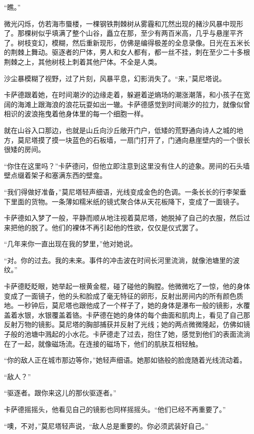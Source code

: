 \documentclass[AutoFakeBold=true]{book}
\begin{document}
``瞧。''

微光闪烁，仿若海市蜃楼，一棵钢铁荆棘树从雾霾和兀然出现的赭沙风暴中现形了。那棵树似乎填满了整个山谷，矗立在那，至少有两百米高，几乎与悬崖平齐了。树枝变幻，模糊，然后重新现形，仿佛是编得极差的全息录像。日光在五米长的荆棘上舞动。驱逐者的尸体，男人和女人都有，都一丝不挂，刺在至少二十多根荆棘之上，其他树枝上刺着其他尸体。不全是人类。

沙尘暴模糊了视野，过了片刻，风暴平息，幻影消失了。``来，''莫尼塔说。

卡萨德跟着她，在时间潮汐的边缘走着，躲避着逆熵场的潮涨潮落，和小孩子在宽阔的海滩上跟海浪的浪花玩耍如出一辙。卡萨德感觉到时间潮汐的拉力，就像似曾相识的波浪拖曳着他身体里的每一个细胞一样。

就在山谷入口那边，也就是山丘向沙丘敞开门户，低矮的荒野通向诗人之城的地方，莫尼塔摸了摸一块蓝色的石板墙，一扇门打开了，门通向悬崖壁内的一个很长很矮的房间。

``你住在这里吗？''卡萨德问，但他立即注意到这里没有住人的迹象。房间的石头墙壁点缀着架子和塞满东西的壁龛。

``我们得做好准备，''莫尼塔轻声细语，光线变成金色的色调。一条长长的行李架垂下里面的货物。一条薄如糯米纸的镜式聚合体从天花板降下，变成了一面镜子。

卡萨德如入梦了一般，平静而顺从地注视着莫尼塔，她脱掉了自己的衣服，然后过来把他的脱了。他们的裸体不再引起他的性欲，仅仅是仪式罢了。

``几年来你一直出现在我的梦里，''他对她说。

``对。你的过去。我的未来。事件的冲击波在时间长河里流淌，就像池塘里的波纹。''

卡萨德眨眨眼，她举起一根黄金棍，碰了碰他的胸膛。他微微吃了一惊，他的身体变成了一面镜子，他的头和脸成了毫无特征的卵形，反射出房间内的所有颜色质地。一秒钟后，莫尼塔也跟他成了一个样子了，她的身体是瀑布一般的镜影，水覆盖着水银，水银覆盖着铬。卡萨德在她的身体的每个曲面和肌肉上，看见了自己那反射万物的镜影。莫尼塔的胸部捕获并反射了光线；她的两点微微隆起，仿佛如镜子般的池塘中溅起的小水花。卡萨德走了过去，抱住了她，感觉到他们的表面流淌在了一起，就像磁场流。在连接的磁场下，他们的肌肤互相轻触。

``你的敌人正在城市那边等你，''她轻声细语。她那如铬般的脸庞随着光线流动着。

``敌人？''

``驱逐者。跟你来这儿的那伙驱逐者。''

卡萨德摇摇头，他看见自己的镜影也同样摇摇头。``他们已经不再重要了。''

``噢，不对，''莫尼塔轻声说，``敌人总是重要的。你必须武装好自己。''
\end{document}
